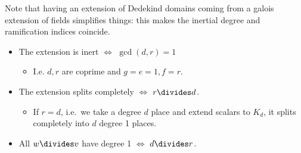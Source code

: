 \begin{remark}

Note that having an extension of Dedekind domains coming from a galois
extension of fields simplifies things: this makes the inertial degree
and ramification indices coincide.

\end{remark}

\begin{example}[?]

\envlist

\begin{itemize}
\item
  The extension is inert \(\iff\) \(\gcd(d, r) = 1\)

  \begin{itemize}
  \tightlist
  \item
    I.e. \(d, r\) are coprime and \(g=e=1, f=r\).
  \end{itemize}
\item
  The extension splits completely \(\iff\) \(r \divides d\).

  \begin{itemize}
  \tightlist
  \item
    If \(r=d\), i.e.~we take a degree \(d\) place and extend scalars to
    \(K_d\), it splits completely into \(d\) degree 1 places.
  \end{itemize}
\item
  All \(w\divides v\) have degree 1 \(\iff\) \(d\divides r\).
\end{itemize}

\end{example}

